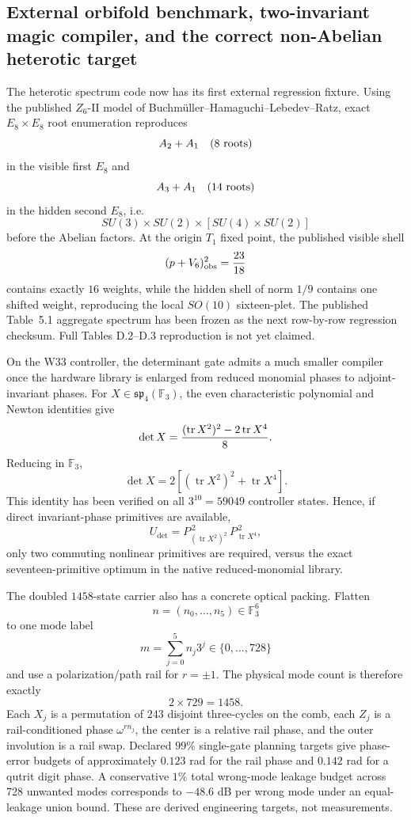 \subsection{External orbifold benchmark, two-invariant magic compiler, and the correct non-Abelian heterotic target}
\label{sec:20260918-benchmark-twoinv-transducer-s3}

The heterotic spectrum code now has its first external regression fixture.
Using the published \(Z_6\)-II model of
Buchm\"uller--Hamaguchi--Lebedev--Ratz, exact \(E_8\times E_8\) root
enumeration reproduces
\[
A_2+A_1\quad(8\ {\rm roots})
\]
in the visible first \(E_8\) and
\[
A_3+A_1\quad(14\ {\rm roots})
\]
in the hidden second \(E_8\), i.e.
\[
SU(3)\times SU(2)\times[SU(4)\times SU(2)]
\]
before the Abelian factors.  At the origin \(T_1\) fixed point, the published
visible shell
\[
(p+V_6)^2_{\rm obs}={23\over18}
\]
contains exactly \(16\) weights, while the hidden shell of norm \(1/9\)
contains one shifted weight, reproducing the local \(SO(10)\) sixteen-plet.
The published Table~5.1 aggregate spectrum has been frozen as the next
row-by-row regression checksum.  Full Tables D.2--D.3 reproduction is not yet
claimed.

On the W33 controller, the determinant gate admits a much smaller compiler
once the hardware library is enlarged from reduced monomial phases to
adjoint-invariant phases.  For \(X\in\mathfrak{sp}_4(\mathbb F_3)\), the
even characteristic polynomial and Newton identities give
\[
\det X={(\operatorname{tr}X^2)^2-2\operatorname{tr}X^4\over8}.
\]
Reducing in \(\mathbb F_3\),
\[
\boxed{\det X=2\left[(\operatorname{tr}X^2)^2+\operatorname{tr}X^4\right]}.
\]
This identity has been verified on all \(3^{10}=59049\) controller states.
Hence, if direct invariant-phase primitives are available,
\[
\boxed{U_{\det}=P_{(\operatorname{tr}X^2)^2}^{\,2}\,
                  P_{\operatorname{tr}X^4}^{\,2}},
\]
only two commuting nonlinear primitives are required, versus the exact
seventeen-primitive optimum in the native reduced-monomial library.

The doubled \(1458\)-state carrier also has a concrete optical packing.  Flatten
\[
n=(n_0,\ldots,n_5)\in\mathbb F_3^6
\]
to one mode label
\[
m=\sum_{j=0}^{5}n_j3^j\in\{0,\ldots,728\}
\]
and use a polarization/path rail for \(r=\pm1\).  The physical mode count is
therefore exactly
\[
2\times729=1458.
\]
Each \(X_j\) is a permutation of \(243\) disjoint three-cycles on the comb,
each \(Z_j\) is a rail-conditioned phase \(\omega^{r n_j}\), the center is a
relative rail phase, and the outer involution is a rail swap.  Declared
\(99\%\) single-gate planning targets give phase-error budgets of approximately
\(0.123\) rad for the rail phase and \(0.142\) rad for a qutrit digit phase.
A conservative \(1\%\) total wrong-mode leakage budget across 728 unwanted
modes corresponds to \(-48.6\) dB per wrong mode under an equal-leakage union
bound.  These are derived engineering targets, not measurements.

